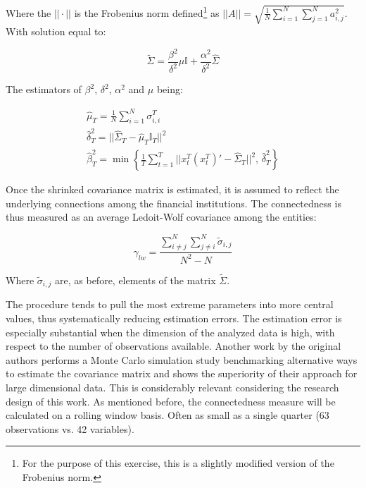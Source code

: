 \documentclass[12pt]{article}
\begin{document}
Where the $||\cdot||$ is the Frobenius norm defined\footnote{For the purpose of this exercise, this is a slightly modified version of the Frobenius norm.} as $||A|| = \sqrt{\frac{1}{N} \sum_{i=1}^{N} \sum_{j=1}^{N} a_{i,j}^2}$. With solution equal to:

\begin{equation}
	\tilde{\Sigma} = \frac{\beta^2}{\delta^2} \mu \mathbb{I} + \frac{\alpha^2}{\delta^2} \hat{\Sigma}
\end{equation}

The estimators of $\beta^2$, $\delta^2$, $\alpha^2$ and $\mu$ being:

\begin{equation}
	\begin{aligned}
	\hat{\mu}_T = \frac{1}{N} \sum_{i=1}^{N} \sigma^T_{i,i} \\
	\hat{\delta}^2_T = ||\hat{\Sigma}_T - \hat{\mu}_T \mathbb{I}_T ||^2 \\
	\hat{\beta}^2_T = \min \left\{ \frac{1}{T} \sum_{t=1}^T || x_t^T (x_t^T)' - \hat{\Sigma}_T||^2,\, \hat{\delta}^2_T \right\}
	\end{aligned}
\end{equation}

Once the shrinked covariance matrix is estimated, it is assumed to reflect the underlying connections among the financial institutions. The connectedness is thus measured as an average Ledoit-Wolf covariance among the entities:

\begin{equation}
	\gamma_{lw} = \frac{\sum_{i \neq j}^{N} \sum_{j \neq i}^N \tilde{\sigma}_{i,j}}{N^2 - N}
\end{equation}

Where $\tilde{\sigma}_{i,j}$ are, as before, elements of the matrix $\tilde{\Sigma}$.

The procedure tends to pull the most extreme parameters into more central values, thus systematically reducing estimation errors. The estimation error is especially substantial when the dimension of the analyzed data is high, with respect to the number of observations available. Another work by the original authors \cite{ledoit04} performs a Monte Carlo simulation study benchmarking alternative ways to estimate the covariance matrix and shows the superiority of their approach for large dimensional data. This is considerably relevant considering the research design of this work. As mentioned before, the connectedness measure will be calculated on a rolling window basis. Often as small as a single quarter (63 observations vs. 42 variables). 
\end{document}
